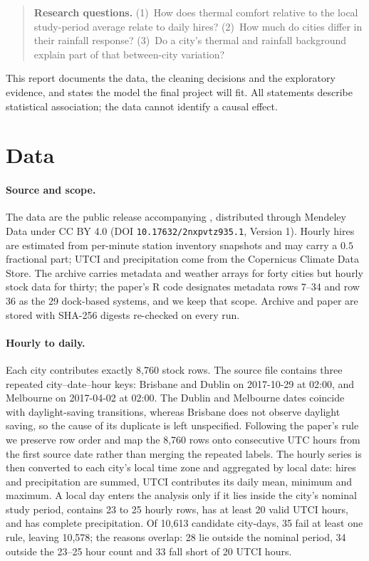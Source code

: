 \documentclass{article}
\begin{document}
\begin{quote}
\textbf{Research questions.} (1)~How does thermal comfort relative to the local
study-period average relate to daily hires? (2)~How much do cities differ in
their rainfall response? (3)~Do a city's thermal and rainfall background explain
part of that between-city variation?
\end{quote}

This report documents the data, the cleaning decisions and the exploratory
evidence, and states the model the final project will fit. All statements
describe statistical association; the data cannot identify a causal effect.

\section{Data}
\label{sec:data}

\paragraph{Source and scope.} The data are the public release accompanying
\citet{bean2021weather}, distributed through Mendeley Data
\citep{mendeley2021bikeshare} under CC BY 4.0 (DOI
\texttt{10.17632/2nxpvtz935.1}, Version 1). Hourly hires are estimated from
per-minute station inventory snapshots and may carry a $0.5$ fractional part;
UTCI and precipitation come from the Copernicus Climate Data Store. The archive
carries metadata and weather arrays for forty cities but hourly stock data for
thirty; the paper's R code designates metadata rows 7--34 and row 36 as the 29
dock-based systems, and we keep that scope. Archive and paper
are stored with SHA-256 digests re-checked on every run.

\paragraph{Hourly to daily.} Each city contributes exactly 8{,}760 stock rows.
The source file contains three repeated city--date--hour keys: Brisbane and
Dublin on 2017-10-29 at 02:00, and Melbourne on 2017-04-02 at 02:00. The Dublin
and Melbourne dates coincide with daylight-saving transitions, whereas Brisbane
does not observe daylight saving, so the cause of its duplicate is left
unspecified. Following the paper's rule we preserve row
order and map the 8{,}760 rows onto consecutive UTC hours from the first source
date rather than merging the repeated labels. The hourly series is then converted
to each city's local time zone and aggregated by local date: hires and
precipitation are summed, UTCI contributes its daily mean, minimum and maximum. A
local day enters the analysis only if it lies inside the city's nominal study
period, contains 23 to 25 hourly rows, has at least 20 valid UTCI hours, and has
complete precipitation. Of 10{,}613 candidate city-days, 35 fail at least one
rule, leaving 10{,}578; the reasons overlap: 28 lie outside the nominal period,
34 outside the 23--25 hour count and 33 fall short of 20 UTCI hours.
\end{document}
